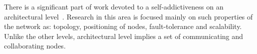 There is a significant part of work devoted to a self-addictiveness on an
architectural level~\cite{}. Research in this area is focused mainly on such
properties of the network as: topology, positioning of nodes, fault-tolerance
and scalability. Unlike the other levels, architectural level implies a set of
communicating and collaborating nodes.

